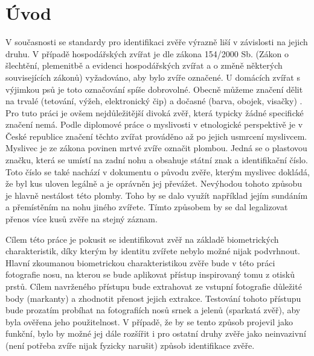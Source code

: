
%

\chapter{Úvod}

V současnosti se standardy pro identifikaci zvěře výrazně liší v závislosti na jejich druhu. V případě hospodářských zvířat je dle zákona 154/2000 Sb. (Zákon o šlechtění, plemenitbě a evidenci hospodářských zvířat a o změně některých souvisejících zákonů) vyžadováno, aby bylo zvíře označené. U domácích zvířat s výjimkou psů je toto označování spíše dobrovolné. Obecně můžeme značení dělit na trvalé (tetování, výžeh, elektronický čip) a dočasné (barva, obojek, visačky) \cite{wiki}. Pro tuto práci je ovšem nejdůležitější divoká zvěř, která typicky žádné specifické značení nemá. Podle diplomové práce o myslivosti v etnologické perspektivě \cite{myslivci} je v České republice značení těchto zvířat prováděno až po jejich usmrcení myslivcem. Myslivec je ze zákona povinen mrtvé zvíře označit plombou. Jedná se o plastovou značku, která se umístí na zadní nohu a obsahuje státní znak a identifikační číslo. Toto číslo se také nachází v dokumentu o původu zvěře, kterým myslivec dokládá, že byl kus uloven legálně a je oprávněn jej převážet. Nevýhodou tohoto způsobu je hlavně nestálost této plomby. Toho by se dalo využít například jejím sundáním a přemístěním na nohu jiného zvířete. Tímto způsobem by se dal legalizovat přenos více kusů zvěře na stejný záznam. 

Cílem této práce je pokusit se identifikovat zvěř na základě biometrických charakteristik, díky kterým by identitu zvířete nebylo možné nijak podvrhnout. Hlavní zkoumanou biometrickou charakteristikou zvěře bude v této práci fotografie nosu, na kterou se bude aplikovat přístup inspirovaný tomu z otisků prstů. Cílem navrženého přístupu bude extrahovat ze vstupní fotografie důležité body (markanty) a zhodnotit přenost jejich extrakce. Testování tohoto přístupu bude prozatím probíhat na fotografiích nosů srnek a jelenů (sparkatá zvěř), aby byla ověřena jeho použitelnost. V případě, že by se tento způsob projevil jako funkční, bylo by možné jej dále rozšířit i pro ostatní druhy zvěře jako neinvazivní (není potřeba zvíře nijak fyzicky narušit) způsob identifikace zvěře.



